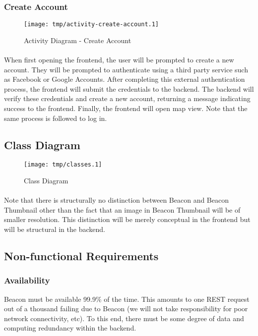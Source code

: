         \subsubsection{Create Account}
        \begin{figure}[H]
            \centering
            \texttt{[image: tmp/activity-create-account.1]} 
            \caption{Activity Diagram - Create Account}
        \end{figure}

        \paragraph*{}
        When first opening the frontend, the user will be prompted to create a new
        account. They will be prompted to authenticate using a third party service
        such as Facebook or Google Accounts. After completing this external
        authentication process, the frontend will submit the credentials to the
        backend. The backend will verify these credentials and create a new account,
        returning a message indicating success to the frontend. Finally, the frontend
        will open map view. Note that the same process is followed to log in.

    \subsection{Class Diagram}
        \begin{figure}[H]
            \centering
            \texttt{[image: tmp/classes.1]} 
            \caption{Class Diagram}
        \end{figure}

        \paragraph*{}
        Note that there is 
        structurally no distinction between Beacon and Beacon Thumbnail other 
        than the fact that an image in Beacon Thumbnail will be of smaller resolution. 
        This distinction will be merely conceptual in the frontend but will be 
        structural in the backend. 

    \subsection{Non-functional Requirements}
        \subsubsection{Availability} 
        Beacon must be available 99.9\% of the time. This amounts to one REST request
        out of a thousand failing due to Beacon (we will not take responsibility for
        poor network connectivity, etc). To this end, there must be some degree of data
        and computing redundancy within the backend.

